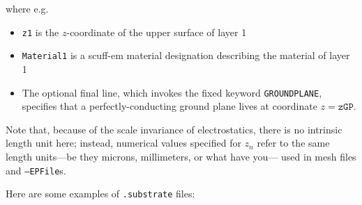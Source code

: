 \documentclass[letterpaper]{article}
\begin{document}
\medskip

where e.g.
\begin{itemize}
 \item \texttt{z1} is the $z$-coordinate of the upper surface of
       layer 1
 \item \texttt{Material1} is a {\sc scuff-em} material designation
       describing the material of layer 1
 \item The optional 
       final line, which invokes the fixed keyword \texttt{GROUNDPLANE},
       specifies that a perfectly-conducting ground plane lives at 
       coordinate $z=\texttt{zGP}$.
\end{itemize}

Note that, because of the scale invariance of electrostatics,
there is no intrinsic length unit here; instead, numerical values
specified for $z_n$ refer to the same length units---be they
microns, millimeters, or what have you--- used in mesh files 
and \texttt{--EPFile}s.

Here are some examples of \texttt{.substrate} files:
\end{document}
